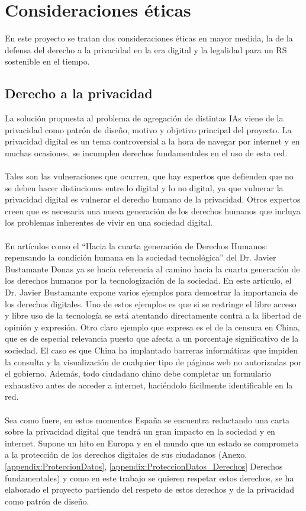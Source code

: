 \chapter{Consideraciones éticas}
\thispagestyle{fancy}

En este proyecto se tratan dos consideraciones éticas en mayor medida, la de la defensa del derecho a la privacidad en la era digital y la legalidad para un RS sostenible en el tiempo.

\section{Derecho a la privacidad}

La solución propuesta al problema de agregación de distintas IAs viene de la privacidad como patrón de diseño, motivo y objetivo principal del proyecto. La privacidad digital es un tema controversial a la hora de navegar por internet y en muchas ocasiones, se incumplen derechos fundamentales en el uso de esta red.
\\\\
Tales son las vulneraciones que ocurren, que hay expertos que defienden que no se deben hacer distinciones entre lo digital y lo no digital, ya que vulnerar la privacidad digital es vulnerar el derecho humano de la privacidad. Otros expertos creen que es necesaria una nueva generación de los derechos humanos que incluya los problemas inherentes de vivir en una sociedad digital.
\\\\
En artículos como el “Hacia la cuarta generación de Derechos Humanos: repensando la condición humana en la sociedad tecnológica”\autocite{donasHACIACUARTAGENERACION} del Dr. Javier Bustamante Donas ya se hacía referencia al camino hacia la cuarta generación de los derechos humanos por la tecnologización de la sociedad. En este artículo, el Dr. Javier Bustamante expone varios ejemplos para demostrar la importancia de los derechos digitales. Uno de estos ejemplos es que si se restringe el libre acceso y libre uso de la tecnología se está atentando directamente contra a la libertad de opinión y expresión. Otro claro ejemplo que expresa es el de la censura en China, que es de especial relevancia puesto que afecta a un porcentaje significativo de la sociedad. El caso es que China ha implantado barreras informáticas que impiden la consulta y la visualización de cualquier tipo de páginas web no autorizadas por el gobierno. Además, todo ciudadano chino debe completar un formulario exhaustivo antes de acceder a internet, haciéndolo fácilmente identificable en la red.
\\\\
Sea como fuere, en estos momentos España se encuentra redactando una carta sobre la privacidad digital que tendrá un gran impacto en la sociedad y en internet. Supone un hito en Europa y en el mundo que un estado se comprometa a la protección de los derechos digitales de sus ciudadanos (Anexo.\ref{appendix:ProteccionDatos}, \ref{appendix:ProteccionDatos_Derechos} Derechos fundamentales) y como en este trabajo se quieren respetar estos derechos, se ha elaborado el proyecto partiendo del respeto de estos derechos y de la privacidad como patrón de diseño. 

